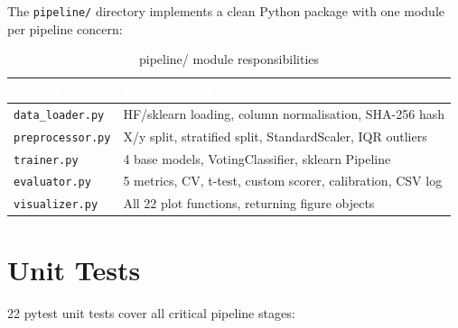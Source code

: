 \documentclass[12pt, a4paper]{report}
\newcommand{\code}[1]{\texttt{\small\textcolor{primary}{#1}}}
\begin{document}
The \code{pipeline/} directory implements a clean Python package with one module per
pipeline concern:

\begin{table}[H]
\centering
\caption{pipeline/ module responsibilities}
\begin{tabular}{@{}L{4cm}L{9cm}@{}}
\toprule
{}
\textcolor{white}{\textbf{Module}} &
\textcolor{white}{\textbf{Responsibility}} \\
\midrule
\code{data\_loader.py}  & HF/sklearn loading, column normalisation, SHA-256 hash \\
\code{preprocessor.py}  & X/y split, stratified split, StandardScaler, IQR outliers \\
\code{trainer.py}       & 4 base models, VotingClassifier, sklearn Pipeline \\
\code{evaluator.py}     & 5 metrics, CV, t-test, custom scorer, calibration, CSV log \\
\code{visualizer.py}    & All 22 plot functions, returning figure objects \\
\bottomrule
\end{tabular}
\end{table}

\section{Unit Tests}

22 pytest unit tests cover all critical pipeline stages:
\end{document}
